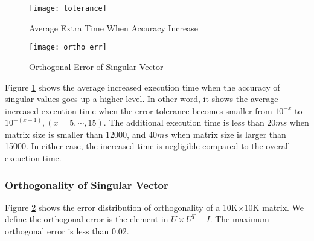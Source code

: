 \begin{figure}[htbp]
\vspace{-0.1in}
\centering
\texttt{[image: tolerance]}
\vspace{-0.1in}
\caption{Average Extra Time When Accuracy Increase}
\label{fig:tolerance}
\vspace{-0.1in}
\end{figure}
\begin{figure}[hbpt]
\vspace{-0.1in}
\centering
\texttt{[image: ortho\_err]}
\vspace{-0.1in}
\caption{Orthogonal Error of Singular Vector}
\label{fig:ortho_err}
\vspace{-0.1in}
\end{figure}
Figure \ref{fig:tolerance} shows the average increased execution time when the accuracy of singular values goes up a higher level.
In other word, it shows the average increased execution time when the error tolerance becomes smaller from $10^{-x}$ to $10^{-(x+1)}, (x=5,\cdots,15)$.
The additional execution time is less than $20 ms$ when matrix size is smaller than 12000, and $40 ms$ when matrix size is larger than 15000.
In either case, the increased time is negligible compared to the overall exeuction time.

\subsubsection{Orthogonality of Singular Vector}
Figure \ref{fig:ortho_err} shows the error distribution of orthogonality of a 10K$\times$10K matrix. We define the orthogonal error is the element in $U\times U^T - I$. The maximum orthogonal error is less than 0.02.
